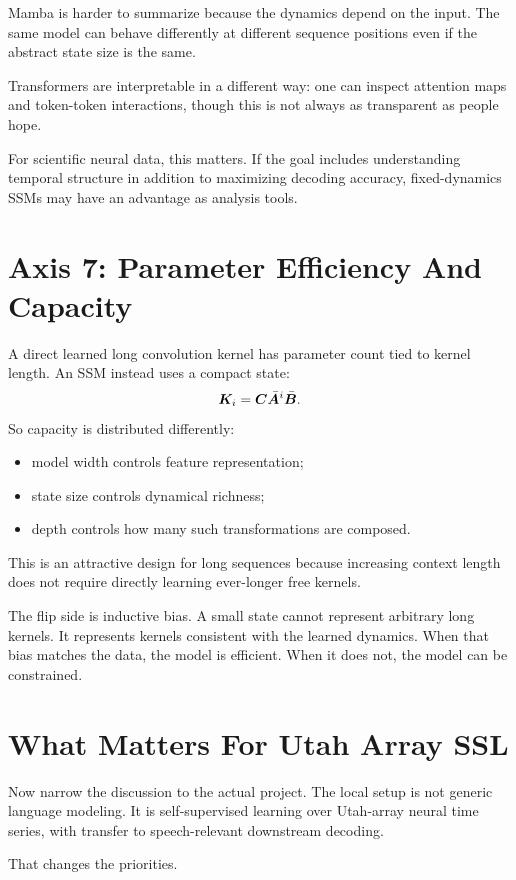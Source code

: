 Mamba is harder to summarize because the dynamics depend on the input. The same model can
behave differently at different sequence positions even if the abstract state size is the
same.

Transformers are interpretable in a different way: one can inspect attention maps and
token-token interactions, though this is not always as transparent as people hope.

For scientific neural data, this matters. If the goal includes understanding temporal
structure in addition to maximizing decoding accuracy, fixed-dynamics SSMs may have an
advantage as analysis tools.

\section{Axis 7: Parameter Efficiency And Capacity}

A direct learned long convolution kernel has parameter count tied to kernel length. An SSM
instead uses a compact state:
\[
  \bm{K}_i = \bm{C}\bar{\bm{A}}^i\bar{\bm{B}}.
\]
So capacity is distributed differently:

\begin{itemize}
  \item model width controls feature representation;
  \item state size controls dynamical richness;
  \item depth controls how many such transformations are composed.
\end{itemize}

This is an attractive design for long sequences because increasing context length does not
require directly learning ever-longer free kernels.

The flip side is inductive bias. A small state cannot represent arbitrary long kernels. It
represents kernels consistent with the learned dynamics. When that bias matches the data,
the model is efficient. When it does not, the model can be constrained.

\section{What Matters For Utah Array SSL}

Now narrow the discussion to the actual project. The local setup is not generic language
modeling. It is self-supervised learning over Utah-array neural time series, with transfer
to speech-relevant downstream decoding.

That changes the priorities.


